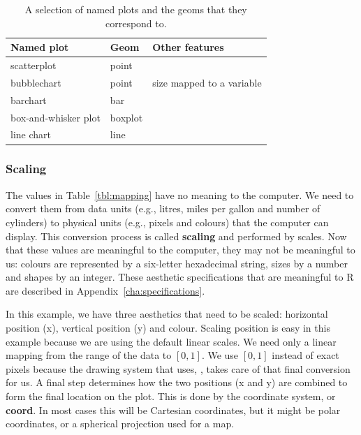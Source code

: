 \begin{table}
  \begin{center}
  \begin{tabular}{lll}
    \toprule 
    Named plot & Geom & Other features \\
    \midrule
    scatterplot & point &  \\
    bubblechart & point & size mapped to a variable \\ 
    barchart & bar &  \\
    box-and-whisker plot & boxplot &  \\
    line chart & line &  \\     
    \bottomrule
  \end{tabular}
  \end{center}
  \caption{A selection of named plots and the geoms that they correspond to.}
  \label{tbl:named-plots}
\end{table}

% 


\subsubsection{Scaling} 

The values in Table~\ref{tbl:mapping} have no meaning to the computer. We need to convert them from data units (e.g., litres, miles per gallon and number of cylinders) to physical units (e.g., pixels and colours) that the computer can display. This conversion process is called {\bf scaling} and performed by scales. Now that these values are meaningful to the computer, they may not be meaningful to us: colours are represented by a six-letter hexadecimal string, sizes by a number and shapes by an integer.  These aesthetic specifications that are meaningful to R are described in Appendix~\ref{cha:specifications}. 

In this example, we have three aesthetics that need to be scaled: horizontal position (x), vertical position (y) and colour. Scaling position is easy in this example because we are using the default linear scales. We need only a linear mapping from the range of the data to $[0, 1]$. We use $[0, 1]$ instead of exact pixels because the drawing system that \ggplot uses, , takes care of that final conversion for us. A final step determines how the two positions (x and y) are combined to form the final location on the plot. This is done by the coordinate system, or {\bf coord}. In most cases this will be Cartesian coordinates, but it might be polar coordinates, or a spherical projection used for a map.

